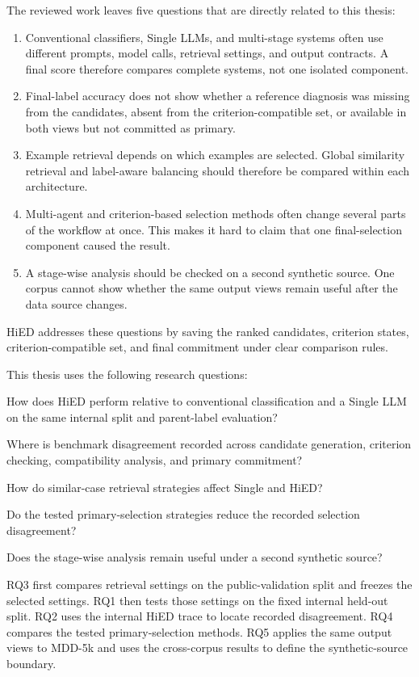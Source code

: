 The reviewed work leaves five questions that are directly related to this thesis:

\begin{enumerate}
    \item Conventional classifiers, Single LLMs, and multi-stage systems often use different prompts, model calls, retrieval settings, and output contracts. A final score therefore compares complete systems, not one isolated component.
    \item Final-label accuracy does not show whether a reference diagnosis was missing from the candidates, absent from the criterion-compatible set, or available in both views but not committed as primary.
    \item Example retrieval depends on which examples are selected. Global similarity retrieval and label-aware balancing should therefore be compared within each architecture.
    \item Multi-agent and criterion-based selection methods often change several parts of the workflow at once. This makes it hard to claim that one final-selection component caused the result.
    \item A stage-wise analysis should be checked on a second synthetic source. One corpus cannot show whether the same output views remain useful after the data source changes.
\end{enumerate}

HiED addresses these questions by saving the ranked candidates, criterion states, criterion-compatible set, and final commitment under clear comparison rules.

This thesis uses the following research questions:

\begin{description}[style=nextline,leftmargin=1.5cm,labelwidth=1.1cm,itemsep=0pt,parsep=0pt,topsep=0pt,partopsep=0pt]
\item[RQ1] How does HiED perform relative to conventional classification and a Single LLM on the same internal split and parent-label evaluation?
\item[RQ2] Where is benchmark disagreement recorded across candidate generation, criterion checking, compatibility analysis, and primary commitment?
\item[RQ3] How do similar-case retrieval strategies affect Single and HiED?
\item[RQ4] Do the tested primary-selection strategies reduce the recorded selection disagreement?
\item[RQ5] Does the stage-wise analysis remain useful under a second synthetic source?
\end{description}

RQ3 first compares retrieval settings on the public-validation split and freezes the selected settings. RQ1 then tests those settings on the fixed internal held-out split. RQ2 uses the internal HiED trace to locate recorded disagreement. RQ4 compares the tested primary-selection methods. RQ5 applies the same output views to MDD-5k and uses the cross-corpus results to define the synthetic-source boundary.
